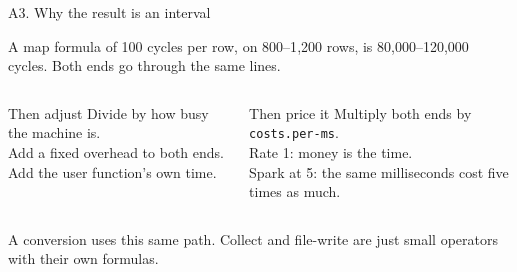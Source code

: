 \documentclass[aspectratio=169,11pt]{beamer}
\begin{document}
\begin{frame}{A3. Why the result is an interval}

{\small A map formula of 100 cycles per row, on 800--1{,}200 rows, is 80{,}000--120{,}000 cycles. Both ends go through the same lines.}

\vspace{0.35cm}
\begin{columns}[T]
\begin{block}{Then adjust}
Divide by how busy the machine is.\\
Add a fixed overhead to both ends.\\
Add the user function's own time.
\end{block}
\begin{block}{Then price it}
Multiply both ends by \texttt{costs.per-ms}.\\
Rate 1: money is the time.\\
Spark at 5: the same milliseconds cost five times as much.
\end{block}
\end{columns}

\vspace{0.3cm}
{\small A conversion uses this same path. Collect and file-write are just small operators with their own formulas.}
\end{frame}
\end{document}
